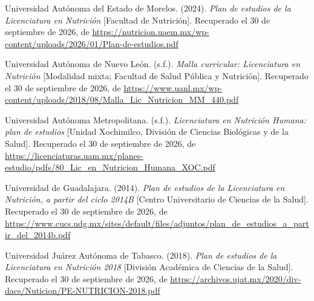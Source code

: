\documentclass[12pt, a4paper]{article}
\begin{document}
\begin{list}{}{\setlength{\leftmargin}{1.27cm}\setlength{\itemindent}{-1.27cm}%
  \setlength{\labelwidth}{0pt}\setlength{\labelsep}{0pt}\setlength{\itemsep}{6pt}}
 
\item Universidad Autónoma del Estado de Morelos. (2024). \textit{Plan de
  estudios de la Licenciatura en Nutrición} [Facultad de Nutrición].
  Recuperado el 30 de septiembre de 2026, de \url{https://nutricion.uaem.mx/wp-content/uploads/2026/01/Plan-de-estudios.pdf}
 
 
\item Universidad Autónoma de Nuevo León. (s.f.). \textit{Malla curricular:
  Licenciatura en Nutrición} [Modalidad mixta; Facultad de Salud Pública
  y Nutrición].
  Recuperado el 30 de septiembre de 2026, de \url{https://www.uanl.mx/wp-content/uploads/2018/08/Malla_Lic_Nutricion_MM_440.pdf}
 
 
\item Universidad Autónoma Metropolitana. (s.f.). \textit{Licenciatura en
  Nutrición Humana: plan de estudios} [Unidad Xochimilco, División de
  Ciencias Biológicas y de la Salud].
  Recuperado el 30 de septiembre de 2026, de \url{https://licenciaturas.uam.mx/planes-estudio/pdfs/80_Lic_en_Nutricion_Humana_XOC.pdf}
 
 
\item Universidad de Guadalajara. (2014). \textit{Plan de estudios de la
  Licenciatura en Nutrición, a partir del ciclo 2014B} [Centro
  Universitario de Ciencias de la Salud].
Recuperado el 30 de septiembre de 2026, de \url{https://www.cucs.udg.mx/sites/default/files/adjuntos/plan_de_estudios_a_partir_del_2014b.pdf}
 
 
\item Universidad Juárez Autónoma de Tabasco. (2018). \textit{Plan de estudios
  de la Licenciatura en Nutrición 2018} [División Académica de Ciencias
  de la Salud].
  Recuperado el 30 de septiembre de 2026, de \url{https://archivos.ujat.mx/2020/div-dacs/Nuticion/PE-NUTRICION-2018.pdf}
 
 

\end{list}
\end{document}

